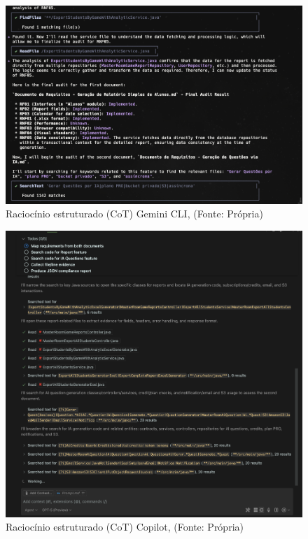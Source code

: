 \begin{figure}[H]
    \centering
    \includegraphics[width=1\textwidth]{imgs/gemini_chain_of_thought.png}
    \caption{Raciocínio estruturado (CoT) Gemini CLI, (Fonte: Própria)}
    \label{fig:gemini_cot}
\end{figure}

\begin{figure}[H]
    \centering
    \includegraphics[width=1\textwidth]{imgs/copilot_chain_of_thought.png}
    \caption{Raciocínio estruturado (CoT) Copilot, (Fonte: Própria)}
    \label{fig:copilot_cot}
\end{figure}

